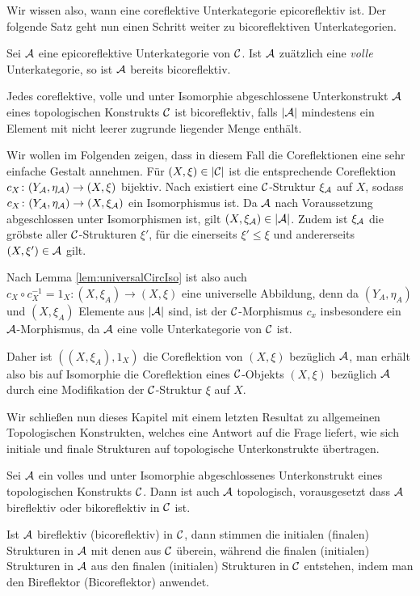 Wir wissen also, wann eine coreflektive Unterkategorie epicoreflektiv ist. 
Der folgende Satz geht nun einen Schritt weiter zu bicoreflektiven Unterkategorien.

\begin{thm}
  Sei $\mathcal{A}$ eine epicoreflektive Unterkategorie von $\mathcal{C}$. 
  Ist $\mathcal{A}$ zuätzlich eine \emph{volle} Unterkategorie, so ist $\mathcal{A}$ bereits bicoreflektiv.
\end{thm}

\begin{bem}
  Jedes coreflektive, volle und unter Isomorphie abgeschlossene Unterkonstrukt $\mathcal{A}$ eines topologischen Konstrukts $\mathcal{C}$ ist bicoreflektiv, falls $|\mathcal{A}|$ mindestens ein Element mit nicht leerer zugrunde liegender Menge enthält.

  Wir wollen im Folgenden zeigen, dass in diesem Fall die Coreflektionen eine sehr einfache Gestalt annehmen.  
  Für $(X, \xi) \in |\mathcal{C}|$ ist die entsprechende Coreflektion $c_X \colon (Y_{\mathcal{A}}, \eta_{\mathcal{A}}) \to (X, \xi)$ bijektiv.
  Nach \cite[1.2.2.7]{preuss} existiert eine $\mathcal{C}$-Struktur $\xi_{\mathcal{A}}$ auf $X$, sodass $c_X \colon (Y_{\mathcal{A}}, \eta_{\mathcal{A}}) \to (X, \xi_{\mathcal{A}})$ ein Isomorphismus ist.
  Da $\mathcal{A}$ nach Voraussetzung abgeschlossen unter Isomorphismen ist, gilt $(X, \xi_{\mathcal{A}})\in |\mathcal{A}|$.
  Zudem ist $\xi_{\mathcal{A}}$ die gröbste aller $\mathcal{C}$-Strukturen $\xi'$, für die einerseits $\xi' \leq \xi$ und andererseits $(X, \xi') \in \mathcal{A}$ gilt.

  Nach Lemma \ref{lem:universalCircIso} ist also auch $c_X \circ c_X^{-1} = 1_X \colon (X,\xi_A) \to (X,\xi)$ eine universelle Abbildung, denn da $(Y_A,\eta_A)$ und $(X,\xi_A)$ Elemente aus $|\mathcal{A}|$ sind, ist der $\mathcal{C}$-Morphismus $c_x$ insbesondere ein $\mathcal{A}$-Morphismus, da $\mathcal{A}$ eine volle Unterkategorie von $\mathcal{C}$ ist.

  Daher ist $((X,\xi_A), 1_X)$ die Coreflektion von $(X,\xi)$ bezüglich $\mathcal{A}$, man erhält also bis auf Isomorphie die Coreflektion eines  $\mathcal{C}$-Objekts $(X,\xi)$ bezüglich $\mathcal{A}$ durch eine Modifikation der $\mathcal{C}$-Struktur $\xi$ auf $X$.
\end{bem}

Wir schließen nun dieses Kapitel mit einem letzten Resultat zu allgemeinen Topologischen Konstrukten, welches eine Antwort auf die Frage liefert, wie sich initiale und finale Strukturen auf topologische Unterkonstrukte übertragen.

\begin{thm}
  Sei $\mathcal{A}$ ein volles und unter Isomorphie abgeschlossenes Unterkonstrukt eines topologischen Konstrukts $\mathcal{C}$.
  Dann ist auch $\mathcal{A}$ topologisch, vorausgesetzt dass $\mathcal{A}$ bireflektiv oder bikoreflektiv in $\mathcal{C}$ ist.
  
  Ist $\mathcal{A}$ bireflektiv (bicoreflektiv) in $\mathcal{C}$, dann stimmen die initialen (finalen) Strukturen in $\mathcal{A}$ mit denen aus $\mathcal{C}$ überein, während die finalen (initialen) Strukturen in $\mathcal{A}$ aus den finalen (initialen) Strukturen in $\mathcal{C}$ entstehen, indem man den Bireflektor (Bicoreflektor) anwendet.
\end{thm}

